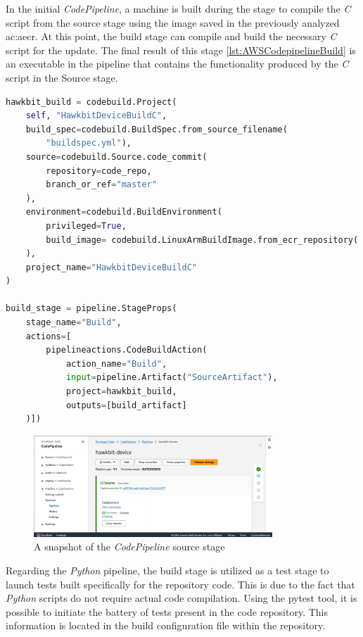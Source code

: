 In the initial \textit{CodePipeline}, a machine is built during the stage to compile the \textit{C} script from the source stage using the image saved in the previously analyzed \gls{ac:aecr}. At this point, the build stage can compile and build the necessary \textit{C} script for the update. The final result of this stage \ref{lst:AWSCodepipelineBuild} is an executable in the pipeline that contains the functionality produced by the \textit{C} script in the Source stage.
\begin{lstlisting}[language=Python, caption={\textit{CDK} code for the \textit{Codecommit} build stage set up}, label=lst:AWSCodepipelineBuild]
hawkbit_build = codebuild.Project(
    self, "HawkbitDeviceBuildC",
    build_spec=codebuild.BuildSpec.from_source_filename(
        "buildspec.yml"),
    source=codebuild.Source.code_commit(
        repository=code_repo,
        branch_or_ref="master"
    ),
    environment=codebuild.BuildEnvironment(
        privileged=True,
        build_image= codebuild.LinuxArmBuildImage.from_ecr_repository( ecr_repository, "v1")
    ),
    project_name="HawkbitDeviceBuildC"
)

build_stage = pipeline.StageProps(
    stage_name="Build",
    actions=[
        pipelineactions.CodeBuildAction(
            action_name="Build",
            input=pipeline.Artifact("SourceArtifact"),
            project=hawkbit_build,
            outputs=[build_artifact]
    )])
\end{lstlisting}
\begin{figure}[h]  %
    \centering
    \includegraphics[width=0.8\textwidth]{images/hawkbitCodepipeline.png}  %
    \caption{A snapshot of the \textit{CodePipeline} source stage}
    \label{fig:HawkbitCodepipeline}
\end{figure}

Regarding the \textit{Python} pipeline, the build stage is utilized as a test stage to launch tests built specifically for the repository code. This is due to the fact that \textit{Python} scripts do not require actual code compilation. Using the pytest tool, it is possible to initiate the battery of tests present in the code repository. This information is located in the build configuration file within the repository.

